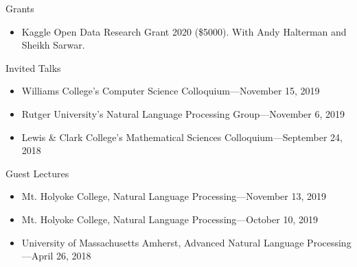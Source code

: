 \documentclass{resume} %
\begin{document}
\begin{rSection}{Grants}
\begin{itemize}
\item  Kaggle Open Data Research Grant 2020 (\$5000). With Andy Halterman and Sheikh Sarwar. 
\end{itemize}

\end{rSection}


\begin{rSection}{Invited Talks}

\begin{itemize}
\item Williams College's Computer Science Colloquium---November 15, 2019
\item Rutger University's Natural Language Processing Group---November 6, 2019
\item Lewis \& Clark College's Mathematical Sciences Colloquium---September 24, 2018
\end{itemize}

\end{rSection}


\begin{rSection}{Guest Lectures}

\begin{itemize}
\item Mt. Holyoke College, Natural Language Processing---November 13, 2019
\item Mt. Holyoke College, Natural Language Processing---October 10, 2019
\item University of Massachusetts Amherst, Advanced Natural Language Processing---April 26, 2018
\end{itemize}

\end{rSection}

\end{document}
